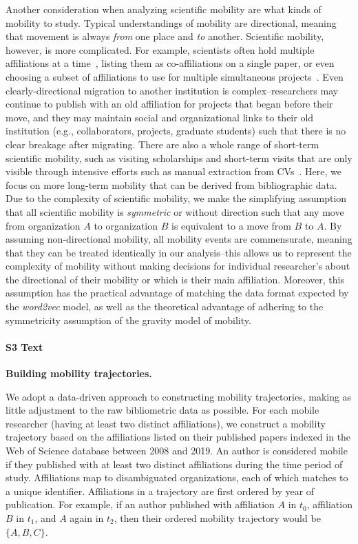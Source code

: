\documentclass[12pt]{article} %
\begin{document}
Another consideration when analyzing scientific mobility are what kinds of mobility to study. 
Typical understandings of mobility are directional, meaning that movement is always \textit{from} one place and \textit{to} another. 
Scientific mobility, however, is more complicated.
For example, scientists often hold multiple affiliations at a time~\autocite{markova2016synchronous}, listing them as co-affiliations on a single paper, or even choosing a subset of affiliations to use for multiple simultaneous projects~\autocite{robinson2019mobility}.
Even clearly-directional migration to another institution is complex--researchers may continue to publish with an old affiliation for projects that began before their move, and they may maintain social and organizational links  to their old institution (e.g., collaborators, projects, graduate students) such that there is no clear breakage after migrating. 
There are also a whole range of short-term scientific mobility, such as visiting scholarships and short-term visits that are only visible through intensive efforts such as manual extraction from CVs~\autocite{woolley2009cv, sandstrom2009cv, canibano2011temporary}.
Here, we focus on more long-term mobility that can be derived from bibliographic data. 
Due to the complexity of scientific mobility, we make the simplifying assumption that all scientific mobility is \textit{symmetric} or without direction such that any move from organization $A$ to organization $B$ is equivalent to a move from $B$ to $A$. 
By assuming non-directional mobility, all mobility events are commensurate, meaning that they can be treated identically in our analysis--this allows us to represent the complexity of mobility without making decisions for individual researcher's about the directional of their mobility or which is their main affiliation.
Moreover, this assumption has the practical advantage of matching the data format expected by the \textit{word2vec} model, as well as the theoretical advantage of adhering to the symmetricity assumption of the gravity model of mobility. 


%
\paragraph*{S3 Text}
\label{si:text:mobility_traj}
{\bf Building mobility trajectories.}

We adopt a data-driven approach to constructing mobility trajectories, making as little adjustment to the raw bibliometric data as possible. 
For each mobile researcher (having at least two distinct affiliations), we construct a mobility trajectory based on the affiliations listed on their published papers indexed in the Web of Science database between 2008 and 2019. 
An author is considered mobile if they published with at least two distinct affiliations during the time period of study. 
Affiliations map to disambiguated organizations, each of which matches to a unique identifier. 
Affiliations in a trajectory are first ordered by year of publication.
For example, if an author published with affiliation $A$ in $t_{0}$, affiliation $B$ in $t_{1}$, and $A$ again in $t_{2}$, then their ordered mobility trajectory would be $\{A, B, C\}$. 
\end{document}
